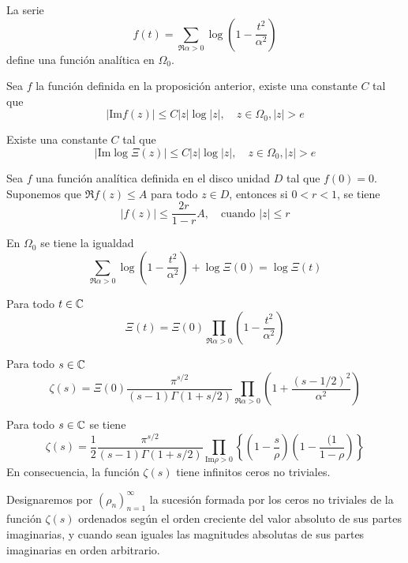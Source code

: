 \documentclass[TAN.tex]{subfiles}
\begin{document}
\begin{prop}
La serie
\[ f(t) = \sum_{\Re α > 0} \log \left(1- \frac{t^2}{α^2}\right) \]
define una función analítica en $Ω_0$.
\end{prop}

\begin{prop}
Sea $f$ la función definida en la proposición anterior, existe una constante $C$ tal que
\[ |\text{Im} f(z)| ≤ C |z| \log |z|, \quad z \in Ω_0, |z| > e \]
\end{prop}

\begin{prop}
Existe una constante $C$ tal que
\[ |\text{Im} \log Ξ(z)| ≤ C |z| \log |z|, \quad z \in Ω_0, |z| > e \]
\end{prop}

\begin{prop}
Sea $f$ una función analítica definida en el disco unidad $D$ tal que $f(0)=0$. Suponemos que $\Re f(z) ≤ A$ para todo $z \in D$, entonces si $0 < r < 1$, se tiene
\[ |f(z)| ≤ \frac{2r}{1-r}A, \quad \text{cuando }|z| ≤ r \]
\end{prop}

\begin{teorema}
En $Ω_0$ se tiene la igualdad
\[ \sum_{\Re α > 0} \log\left(1-\frac{t^2}{α^2}\right) + \log Ξ(0) = \log Ξ(t) \]
\end{teorema}

\begin{coro}
Para todo $t \in \mathbb{C}$
\[ Ξ(t) = Ξ(0) \prod_{\Re α > 0} \left(1-\frac{t^2}{α^2}\right) \]
\end{coro}

\begin{teorema}
Para todo $s \in \mathbb{C}$
\[ ζ(s) = Ξ(0)\frac{π^{s/2}}{(s-1)Γ(1+s/2)} \prod_{\Re α > 0} \left(1 + \frac{(s-1/2)^2}{α^2}\right) \]
\end{teorema}

\begin{teorema}
Para todo $s \in \mathbb{C}$ se tiene
\[ ζ(s) = \frac{1}{2}\frac{π^{s/2}}{(s-1)Γ(1+s/2)} \prod_{\text{Im} ρ > 0} \left\{\left(1-\frac{s}{ρ}\right)\left(1 - \frac{(1}{1-ρ}\right)\right\} \]
En consecuencia, la función $ζ(s)$ tiene infinitos ceros no triviales.
\end{teorema}

Designaremos por $(ρ_n)_{n=1}^{∞}$ la sucesión formada por los ceros no triviales de la función $ζ(s)$ ordenados según el orden creciente del valor absoluto de sus partes imaginarias, y cuando sean iguales las magnitudes absolutas de sus partes imaginarias en orden arbitrario.
\end{document}
